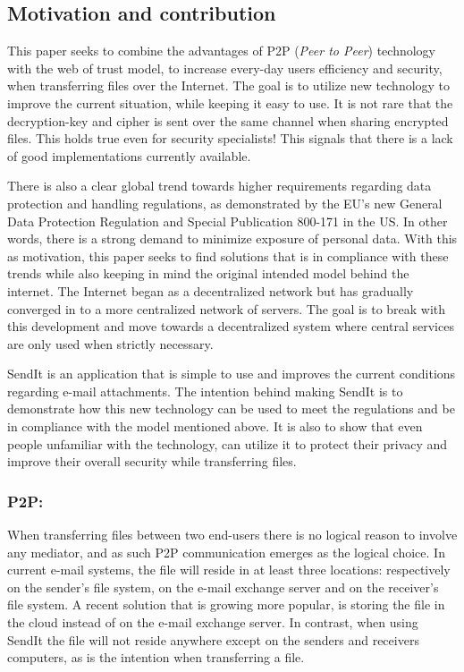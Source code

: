 \documentclass[runningheads]{llncs}
\begin{document}
\subsection{Motivation and contribution}
This paper seeks to combine the advantages of P2P (\textit{Peer to Peer}) technology with the web of trust model, to increase every-day users efficiency and security, when transferring files over the Internet. The goal is to utilize new technology to improve the current situation, while keeping it easy to use. It is not rare that the decryption-key and cipher is sent over the same channel when sharing encrypted files. This holds true even for security specialists! This signals that there is a lack of good implementations currently available. 

There is also a clear global trend towards higher requirements regarding data protection and handling regulations, as demonstrated by the EU's new General Data Protection Regulation \cite{law_gdpr,ar_gdpr} and Special Publication 800-171 in the US.\cite{law_sp800} In other words, there is a strong demand to minimize exposure of personal data. With this as motivation, this paper seeks to find solutions that is in compliance with these trends while also keeping in mind the original intended model behind the internet. The Internet began as a decentralized network but has gradually converged in to a more centralized network of servers.\cite{ar_decent} The goal is to break with this development and move towards a decentralized system where central services are only used when strictly necessary.

SendIt is an application that is simple to use and improves the current conditions regarding e-mail attachments. The intention behind making SendIt is to demonstrate how this new technology can be used to meet the regulations and be in compliance with the model mentioned above. It is also to show that even people unfamiliar with the technology, can utilize it to protect their privacy and improve their overall security while transferring files.   
%
\subsubsection{P2P:} 
When transferring files between two end-users there is no logical reason to involve any mediator, and as such P2P communication emerges as the logical choice. In current e-mail systems, the file will reside in at least three locations: respectively on the sender's file system, on the e-mail exchange server and on the receiver's file system. A recent solution that is growing more popular, is storing the file in the cloud instead of on the e-mail exchange server. In contrast, when using SendIt the file will not reside anywhere except on the senders and receivers computers, as is the intention when transferring a file.
%
\end{document}
